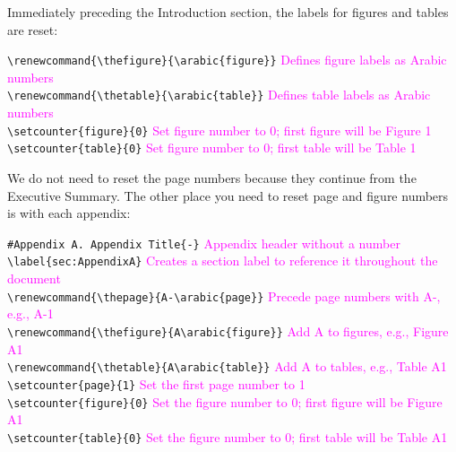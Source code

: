 \documentclass[12pt,]{article}
\begin{document}
\vspace{.5cm}

Immediately preceding the Introduction section, the labels for figures
and tables are reset:

\texttt{\textbackslash{}renewcommand\{\textbackslash{}thefigure\}\{\textbackslash{}arabic\{figure\}\}}
\textcolor{magenta}{Defines figure labels as Arabic numbers}\\
\texttt{\textbackslash{}renewcommand\{\textbackslash{}thetable\}\{\textbackslash{}arabic\{table\}\}}
\textcolor{magenta}{Defines table labels as Arabic numbers}\\
\texttt{\textbackslash{}setcounter\{figure\}\{0\}}
\textcolor{magenta}{Set figure number to 0; first figure will be Figure 1}\\
\texttt{\textbackslash{}setcounter\{table\}\{0\}}
\textcolor{magenta}{Set figure number to 0; first table will be Table 1}

\vspace{.5cm}

We do not need to reset the page numbers because they continue from the
Executive Summary. The other place you need to reset page and figure
numbers is with each appendix:

\texttt{\#Appendix\ A.\ Appendix\ Title\{-\}}
\textcolor{magenta}{Appendix header without a number}\\
\texttt{\textbackslash{}label\{sec:AppendixA\}}
\textcolor{magenta}{Creates a section label to reference it throughout the document}\\
\texttt{\textbackslash{}renewcommand\{\textbackslash{}thepage\}\{A-\textbackslash{}arabic\{page\}\}}
\textcolor{magenta}{Precede page numbers with A-, e.g., A-1}\\
\texttt{\textbackslash{}renewcommand\{\textbackslash{}thefigure\}\{A\textbackslash{}arabic\{figure\}\}}
\textcolor{magenta}{Add A to figures, e.g., Figure A1}\\
\texttt{\textbackslash{}renewcommand\{\textbackslash{}thetable\}\{A\textbackslash{}arabic\{table\}\}}
\textcolor{magenta}{Add A to tables, e.g., Table A1}\\
\texttt{\textbackslash{}setcounter\{page\}\{1\}}
\textcolor{magenta}{Set the first page number to 1}\\
\texttt{\textbackslash{}setcounter\{figure\}\{0\}}
\textcolor{magenta}{Set the figure number to 0; first figure will be Figure A1}\\
\texttt{\textbackslash{}setcounter\{table\}\{0\}}
\textcolor{magenta}{Set the figure number to 0; first table will be Table A1}
\end{document}
